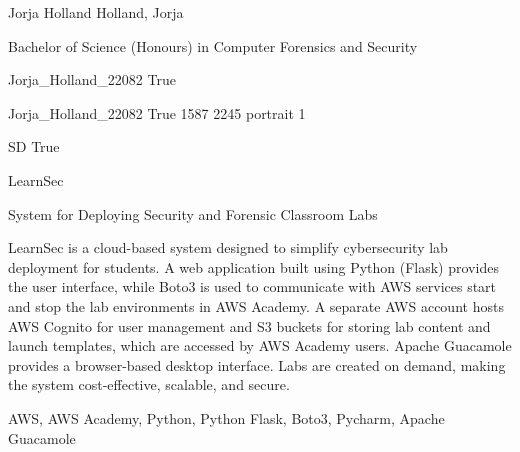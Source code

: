 
\begingroup{}\relax



\def\Key{Jorja_Holland_22082}

{Jorja Holland}
{Holland, Jorja}

{Bachelor of Science (Honours) in Computer Forensics and Security}

{Jorja_Holland_22082}
{True}

{Jorja_Holland_22082}
{True}
{1587}
{2245}
{portrait}
{1}

{SD}
{True}

{LearnSec}

{System for Deploying Security and Forensic Classroom Labs}

{LearnSec is a cloud-based system designed to simplify cybersecurity lab deployment for students. A web application built using Python (Flask) provides the user interface, while Boto3 is used to communicate with AWS services start and stop the lab environments in AWS Academy. A separate AWS account hosts AWS Cognito for user management and S3 buckets for storing lab content and launch templates, which are accessed by AWS Academy users. Apache Guacamole provides a browser-based desktop interface. Labs are created on demand, making the system cost-effective, scalable, and secure.}

{AWS, AWS Academy, Python, Python Flask, Boto3, Pycharm, Apache Guacamole}


